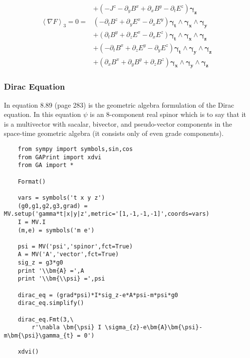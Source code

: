 \documentclass[10pt]{article}
\newcommand{\W}{\wedge}
\newcommand{\grade}[1]{\left < {#1} \right >}
\begin{document}
\begin{align*}
    & +\left ( - J^{z} - \partial_{y} B^{x} + \partial_{x} B^{y} - \partial_{t} E^{z}\right ) \bm{\gamma_{z}} \\
    \grade{\nabla F}_{3} = 0 =  & \left ( - \partial_{t} B^{z} + \partial_{y} E^{x} - \partial_{x} E^{y}\right ) \bm{\gamma_{t}\W \gamma_{x}\W \gamma_{y}} \\
    & +\left ( \partial_{t} B^{y} + \partial_{z} E^{x} - \partial_{x} E^{z}\right ) \bm{\gamma_{t}\W \gamma_{x}\W \gamma_{z}} \\
    & +\left ( - \partial_{t} B^{x} + \partial_{z} E^{y} - \partial_{y} E^{z}\right ) \bm{\gamma_{t}\W \gamma_{y}\W \gamma_{z}} \\
    & +\left ( \partial_{x} B^{x} + \partial_{y} B^{y} + \partial_{z} B^{z}\right ) \bm{\gamma_{x}\W \gamma_{y}\W \gamma_{z}}
    \end{align*}

\subsubsection{Dirac Equation}

In \cite{Doran} equation 8.89 (page 283) is the geometric algebra formulation of the Dirac equation.  In this equation
$\psi$ is an 8-component real spinor which is to say that it is a multivector with sacalar, bivector, and
pseudo-vector components in the space-time geometric algebra (it consists only of even grade components).

\begin{lstlisting}
    from sympy import symbols,sin,cos
    from GAPrint import xdvi
    from GA import *

    Format()

    vars = symbols('t x y z')
    (g0,g1,g2,g3,grad) = MV.setup('gamma*t|x|y|z',metric='[1,-1,-1,-1]',coords=vars)
    I = MV.I
    (m,e) = symbols('m e')

    psi = MV('psi','spinor',fct=True)
    A = MV('A','vector',fct=True)
    sig_z = g3*g0
    print '\\bm{A} =',A
    print '\\bm{\\psi} =',psi

    dirac_eq = (grad*psi)*I*sig_z-e*A*psi-m*psi*g0
    dirac_eq.simplify()

    dirac_eq.Fmt(3,\
        r'\nabla \bm{\psi} I \sigma_{z}-e\bm{A}\bm{\psi}-m\bm{\psi}\gamma_{t} = 0')

    xdvi()
\end{lstlisting}
\end{document}
